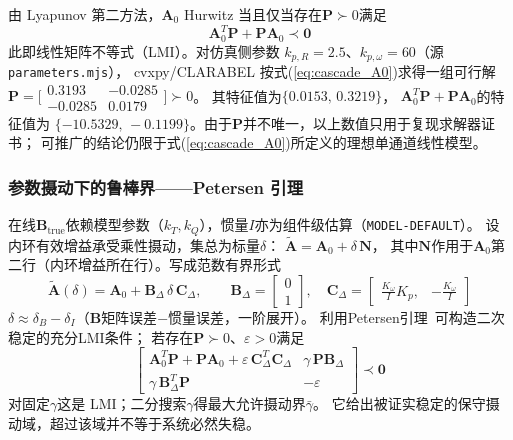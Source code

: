 由 Lyapunov 第二方法，$\mathbf{A}_0$ Hurwitz 当且仅当存在$\mathbf{P}\succ 0$满足
\begin{equation}
    \mathbf{A}_0^T\mathbf{P}+\mathbf{P}\mathbf{A}_0 \prec \mathbf{0}
    \label{eq:cascade_lyap_lmi}
\end{equation}
此即线性矩阵不等式（LMI）。对仿真侧参数
$k_{p,R}=2.5$、$k_{p,\omega}=60$（源 \texttt{parameters.mjs}），
cvxpy/CLARABEL 按式(\ref{eq:cascade_A0})求得一组可行解
$\mathbf{P}=\bigl[\begin{smallmatrix}0.3193 & -0.0285 \\ -0.0285 & 0.0179\end{smallmatrix}\bigr]\succ 0$。
其特征值为$\{0.0153,\,0.3219\}$，
$\mathbf{A}_0^T\mathbf{P}+\mathbf{P}\mathbf{A}_0$的特征值为
$\{-10.5329,\,-0.1199\}$。由于$\mathbf P$并不唯一，以上数值只用于复现求解器证书；
可推广的结论仍限于式(\ref{eq:cascade_A0})所定义的理想单通道线性模型。

\subsubsection{参数摄动下的鲁棒界——Petersen 引理}

在线$\mathbf{B}_{\mathrm{true}}$依赖模型参数（$k_T,k_Q$），惯量$I$亦为组件级估算（\texttt{MODEL-DEFAULT}）。
设内环有效增益承受乘性摄动，集总为标量$\delta$：
$\tilde{\mathbf{A}} = \mathbf{A}_0 + \delta\,\mathbf{N}$，
其中$\mathbf{N}$作用于$\mathbf{A}_0$第二行（内环增益所在行）。写成范数有界形式
\begin{equation}
    \tilde{\mathbf{A}}(\delta) = \mathbf{A}_0 + \mathbf{B}_\Delta\,\delta\,\mathbf{C}_\Delta,\qquad
    \mathbf{B}_\Delta = \begin{bmatrix}0\\1\end{bmatrix},\quad
    \mathbf{C}_\Delta = \begin{bmatrix}\tfrac{K_\omega}{I}K_p, & -\tfrac{K_\omega}{I}\end{bmatrix}
    \label{eq:cascade_uncertainty}
\end{equation}
$\delta\approx\delta_B-\delta_I$（$\mathbf{B}$矩阵误差$-$惯量误差，一阶展开）。
利用Petersen引理~\cite{petersen1987stabilization}可构造二次稳定的充分LMI条件；
若存在$\mathbf P\succ0$、$\varepsilon>0$满足
\begin{equation}
    \begin{bmatrix}
      \mathbf{A}_0^T\mathbf{P}+\mathbf{P}\mathbf{A}_0+\varepsilon\,\mathbf{C}_\Delta^T\mathbf{C}_\Delta
        & \gamma\,\mathbf{P}\mathbf{B}_\Delta \\[3pt]
      \gamma\,\mathbf{B}_\Delta^T\mathbf{P} & -\varepsilon
    \end{bmatrix} \prec \mathbf{0}
    \label{eq:cascade_petersen}
\end{equation}
对固定$\gamma$这是 LMI；二分搜索$\gamma$得最大允许摄动界$\bar\gamma$。
它给出被证实稳定的保守摄动域，超过该域并不等于系统必然失稳。

